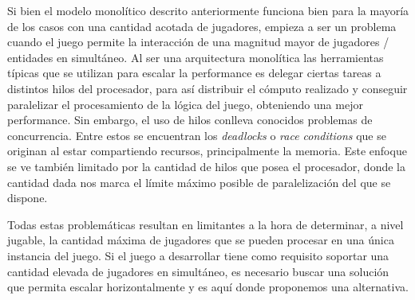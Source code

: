 
\noindent Si bien el modelo monolítico descrito anteriormente funciona bien para la mayoría de los 
casos con una cantidad acotada de jugadores, empieza a ser un problema cuando el juego 
permite la interacción de una magnitud mayor de jugadores / entidades en simultáneo. 
Al ser una arquitectura monolítica las herramientas típicas que se utilizan para escalar 
la performance es delegar ciertas tareas a distintos hilos del procesador, para así distribuir 
el cómputo realizado y conseguir paralelizar el procesamiento de la lógica del juego, obteniendo una mejor performance. 
Sin embargo, el uso de hilos conlleva conocidos problemas de concurrencia. Entre estos se encuentran los \textit{deadlocks} o \textit{race conditions} que se originan al estar compartiendo 
recursos, principalmente la memoria. Este enfoque se ve también limitado por la cantidad de hilos 
que posea el procesador, donde la cantidad dada nos marca el límite máximo posible de paralelización
del que se dispone.

Todas estas problemáticas resultan en limitantes a la hora de determinar, a nivel jugable,
la cantidad máxima de jugadores que se pueden procesar en una única instancia del juego.
Si el juego a desarrollar tiene como requisito soportar una cantidad elevada de jugadores
en simultáneo, es necesario buscar una solución que permita escalar horizontalmente y es aquí donde proponemos
una alternativa.

